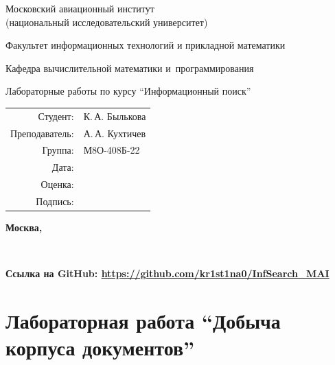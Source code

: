 \documentclass[pdf, unicode, 12pt, a4paper, oneside, fleqn]{article}
\begin{document}
\begin{titlepage}
\begin{center}
\bfseries

{\Large Московский авиационный институт\\ (национальный исследовательский университет)}

\vspace{48pt}

{\large Факультет информационных технологий и прикладной математики}

\vspace{36pt}

{\large Кафедра вычислительной математики и~программирования}

\vspace{48pt}

Лабораторные работы по курсу \enquote{Информационный поиск}

\end{center}

\vspace{72pt}

\begin{flushright}
\begin{tabular}{rl}
Студент: & К.\,А. Былькова \\
Преподаватель: & А.\,А. Кухтичев \\
Группа: & М8О-408Б-22 \\
Дата: & \\
Оценка: & \\
Подпись: & \\
\end{tabular}
\end{flushright}

\vfill

\begin{center}
\bfseries
Москва, \the\year
\end{center}
\end{titlepage}

\pagebreak

\tableofcontents

\

\textbf{Ссылка на GitHub: \href{https://github.com/kr1st1na0/InfSearch_MAI}{https://github.com/kr1st1na0/InfSearch\_MAI}}

\pagebreak

\section{Лабораторная работа  \enquote{Добыча корпуса документов}}
\end{document}
